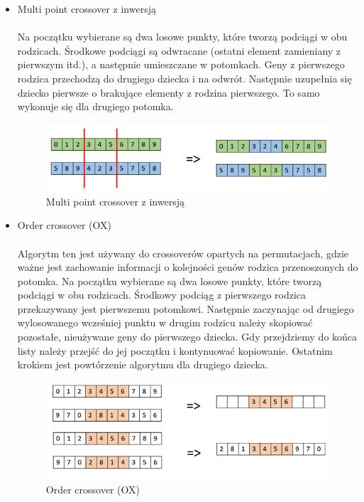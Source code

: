 \documentclass[12pt,a4paper,titlepage]{article}
\begin{document}
\begin{itemize}
    \item Multi point crossover z inwersją \\\\
    Na początku wybierane są dwa losowe punkty, które tworzą podciągi w obu rodzicach. Środkowe podciągi są odwracane (ostatni element zamieniany z pierwszym itd.), a następnie umieszczane w potomkach. Geny z pierwszego rodzica przechodzą do drugiego dziecka i na odwrót. Następnie uzupełnia się dziecko pierwsze o brakujące elementy z rodzina pierwszego. To samo wykonuje się dla drugiego potomka.
    \begin{figure}[H]
    \centering
    \includegraphics[width = 14cm]{images/multi_point_crossover.png}
    \caption{Multi point crossover z inwersją \cite{ga_crossover}}
    \label{fig:mpxi}
    \end{figure}
    \item Order crossover (OX) \\\\
    Algorytm ten jest używany do crossoverów opartych na permutacjach, gdzie ważne jest zachowanie informacji o kolejności genów rodzica przenoszonych do potomka. Na początku wybierane są dwa losowe punkty, które tworzą podciągi w obu rodzicach. Środkowy podciąg z pierwszego rodzica przekazywany jest pierwszemu potomkowi. Następnie zaczynając od drugiego wylosowanego wcześniej punktu w drugim rodzicu należy skopiować pozostałe, nieużywane geny do pierwszego dziecka. Gdy przejdziemy do końca listy należy przejść do jej początku i kontynuować kopiowanie. Ostatnim krokiem jest powtórzenie algorytmu dla drugiego dziecka.
    \begin{figure}[H]
    \centering
    \includegraphics[width = 14cm]{images/david_order_crossover.jpg}
    \caption{Order crossover (OX) \cite{ga_crossover}}
    \label{fig:ox}
    \end{figure}
\end{itemize}
\end{document}
